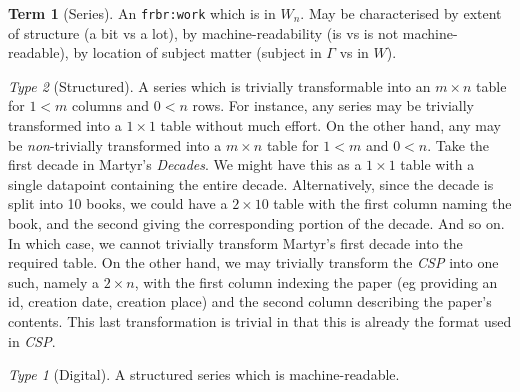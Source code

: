 \documentclass{amsart}%
\newcommand{\code}[1]{\texttt{#1}}%
\newcommand{\titleit}[1]{\textit{#1}}%
\theoremstyle{plain}
\theoremstyle{definition}
\theoremstyle{remark}
\theoremstyle{definition}
\newtheorem{term}{Term}[subsection]%
\theoremstyle{remark}
\newtheorem*{term-type}{Type}
\begin{document}
\begin{term}[Series]
\label{term:series}
An \code{frbr:work} which is in \(W_n\). %
 May be characterised by extent of structure (a bit vs a lot), by machine-readability (is vs is not machine-readable), by location of subject matter (subject in \(\Gamma\) vs in \(W\)). %
\begin{term-type}[Structured]
A series which is trivially transformable into an \(m\times n\) table for \(1<m\) columns and \(0<n\) rows. For instance, any series may be trivially transformed into a \(1\times 1\) table without much effort. On the other hand, any may be \emph{non}-trivially transformed into a \(m\times n\) table for \(1<m\) and \(0<n\). Take the first decade in Martyr's \titleit{Decades}. We might have this as a \(1\times 1\) table with a single datapoint containing the entire decade. Alternatively, since the decade is split into 10 books, we could have a \(2\times 10\) table with the first column naming the book, and the second giving the corresponding portion of the decade. And so on. In which case, we cannot trivially transform Martyr's first decade into the required table. On the other hand, we may trivially transform the \titleit{CSP} into one such, namely a \(2\times n\), with the first column indexing the paper (eg providing an id, creation date, creation place) and the second column describing the paper's contents. This last transformation is trivial in that this is already the format used in \titleit{CSP}.
\begin{term-type}[Digital]
A structured series which is machine-readable.%
\end{term-type}
\end{term-type}
\end{term}
%
%
%
\end{document}

